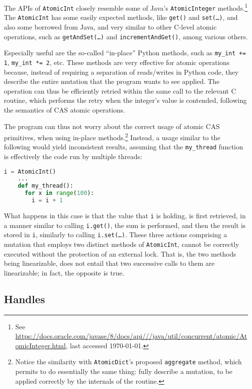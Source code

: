 The APIs of \texttt{AtomicInt} closely resemble some of Java's \texttt{AtomicInteger} methods.\footnote{%
    See \url{https://docs.oracle.com/javase/8/docs/api///java/util/concurrent/atomic/AtomicInteger.html}, last accessed \today.
}
The \texttt{AtomicInt} has some easily expected methods, like \texttt{{get()}} and \texttt{{set(\ldots)}}, and also some borrowed from Java, and very similar to other C-level atomic operations, such as \texttt{getAndSet(\ldots)} and \texttt{{incrementAndGet()}}, among various others.

Especially useful are the so-called ``in-place'' Python methods, such as \texttt{my\_int += 1}, \texttt{my\_int *= 2}, etc.
These methods are very effective for atomic operations because, instead of requiring a separation of reads/writes in Python code, they describe the entire mutation that the program wants to see applied.
The operation can thus be efficiently retried within the same call to the relevant C routine, which performs the retry when the integer's value is contended, following the semantics of CAS atomic operations\@.

The program can thus not worry about the correct usage of atomic CAS primitives, when using in-place methods.\footnote{%
    Notice the similarity with \texttt{AtomicDict}'s proposed \texttt{aggregate} method, which permits to do essentially the same thing: fully describe a mutation, to be applied correctly by the internals of the routine.
}
Instead, a usage similar to the following would yield inconsistent results, assuming that the \texttt{my\_thread} function is effectively the code run by multiple threads:
\begin{lstlisting}[label={lst:atomic-int-bad}, language=Python]
    i = AtomicInt()
    ...
    def my_thread():
      for x in range(100):
        i = i + 1
\end{lstlisting}

What happens in this case is that the value that \texttt{i} is holding, is first retrieved, in a manner similar to calling \texttt{{i.get()}}, the sum is performed, and then the result is stored in \texttt{i}, similarly to calling \texttt{{i.set(\ldots)}}.
These three actions comprising a mutation that employs two distinct methods of \texttt{AtomicInt}, cannot be correctly executed without the protection of an external lock.
That is, the two methods being linearizable, does not entail that two successive calls to them are linearizable; in fact, the opposite is true.


\subsection{Handles}\label{subsec:atomic-int-handles}

